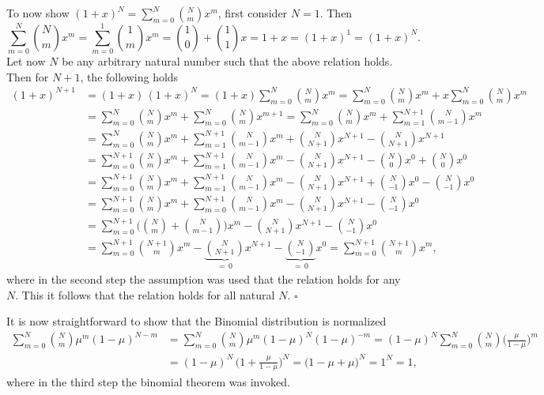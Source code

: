 \documentclass[11pt, a4paper]{scrartcl}
\newcommand{\qed}{\hfill\(\square\)}
\begin{document}
			To now show \( (1 + x)^N = \sum_{m = 0}^{N} { N \choose m } x^m \), first consider \( N = 1 \). Then
			\begin{equation}
				\sum_{m = 0}^{N} { N \choose m } x^m
					= \sum_{m = 0}^{1} { 1 \choose m } x^m
					= { 1 \choose 0 } + { 1 \choose 1 } x
					= 1 + x
					= (1 + x)^1
					= (1 + x)^N.
			\end{equation}
			Let now \(N\) be any arbitrary natural number such that the above relation holds. Then for \(N + 1\), the following holds
			\begin{align}
				(1 + x)^{N + 1}
					&= (1 + x) \, (1 + x)^N
					 = (1 + x) \sum_{m = 0}^{N} { N \choose m } x^m
					 = \sum_{m = 0}^{N} { N \choose m } x^m + x \sum_{m = 0}^{N} { N \choose m } x^m \\
					&= \sum_{m = 0}^{N} { N \choose m } x^m + \sum_{m = 0}^{N} { N \choose m } x^{m + 1}
					 = \sum_{m = 0}^{N} { N \choose m } x^m + \sum_{m = 1}^{N + 1} { N \choose m - 1 } x^m \\
					&= \sum_{m = 0}^{N} { N \choose m } x^m + \sum_{m = 1}^{N + 1} { N \choose m - 1 } x^m + { N \choose N + 1 } x^{N + 1} - { N \choose N + 1 } x^{N + 1} \\
					&= \sum_{m = 0}^{N + 1} { N \choose m } x^m + \sum_{m = 1}^{N + 1} { N \choose m - 1 } x^m - { N \choose N + 1 } x^{N + 1} - { N \choose 0 } x^0 + { N \choose 0 } x^0 \\
					&= \sum_{m = 0}^{N + 1} { N \choose m } x^m + \sum_{m = 1}^{N + 1} { N \choose m - 1 } x^m - { N \choose N + 1 } x^{N + 1} + { N \choose -1 } x^0 - { N \choose -1 } x^0 \\
					&= \sum_{m = 0}^{N + 1} { N \choose m } x^m + \sum_{m = 0}^{N + 1} { N \choose m - 1 } x^m - { N \choose N + 1 } x^{N + 1} - { N \choose -1 } x^0 \\
					&= \sum_{m = 0}^{N + 1} \Bigg(\! { N \choose m } + { N \choose m - 1 } \!\Bigg) x^m - { N \choose N + 1 } x^{N + 1} - { N \choose -1 } x^0 \\
					&= \sum_{m = 0}^{N + 1} { N + 1 \choose m } x^m - \underbrace{{ N \choose N + 1 }}_{=\, 0} x^{N + 1} - \underbrace{{ N \choose -1 }}_{=\, 0} x^0
					 = \sum_{m = 0}^{N + 1} { N + 1 \choose m } x^m,
			\end{align}
			where in the second step the assumption was used that the relation holds for any \(N\). This it follows that the relation holds for all natural \(N\).
			\qed

			It is now straightforward to show that the Binomial distribution is normalized
			\begin{align}
				\sum_{m = 0}^{N} { N \choose m } \mu^m (1 - \mu)^{N - m}
					&= \sum_{m = 0}^{N} { N \choose m } \mu^m (1 - \mu)^N (1 - \mu)^{-m}
					 = (1 - \mu)^N \sum_{m = 0}^{N} { N \choose m } \bigg( \frac{\mu}{1 - \mu} \bigg)^m \\
					&= (1 - \mu)^N \,\bigg(\! 1 + \frac{\mu}{1 - \mu} \bigg)^N
					 = \big( 1 - \mu + \mu \big)^N
					 = 1^N
					 = 1,
			\end{align}
			where in the third step the binomial theorem was invoked.
\end{document}
